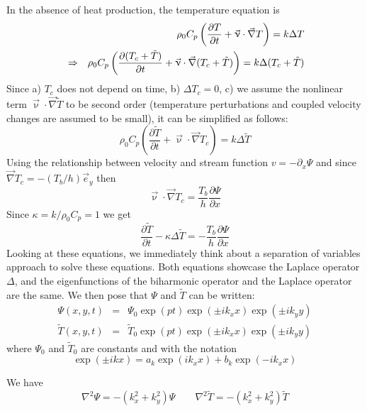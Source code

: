 In the absence of heat production, the temperature equation is 
\begin{eqnarray}
&& \rho_0 C_p \left( \frac{\partial T}{\partial t} + {\vec \upnu}\cdot {\vec \nabla} T \right) 
= k \Delta T \nonumber\\
&\Rightarrow&
\rho_0 C_p \left( \frac{\partial (T_c+\tilde{T})}{\partial t} + {\vec \upnu}\cdot {\vec \nabla} 
(T_c+\tilde{T}) \right) 
= k \Delta (T_c+\tilde{T})
\end{eqnarray}
Since a) $T_c$ does not depend on time, b) $\Delta T_c=0$, c) we assume the nonlinear 
term ${\vec \upnu}\cdot {\vec \nabla} \tilde{T} $ to be second order (temperature perturbations and 
coupled velocity changes are assumed to be small), it can be simplified as follows:
\[
\rho_0 C_p \left( \frac{\partial \tilde{T}}{\partial t} + {\vec \upnu}\cdot {\vec \nabla} T_c \right) 
= k \Delta \tilde{T}
\]
Using the relationship between velocity and stream function
$v=-\partial_x \Psi$
and since $\vec\nabla T_c = - (T_b/h) \vec{e}_y$ then
\[
{\vec \upnu}\cdot {\vec \nabla} T_c =  \frac{T_b}{h}   \frac{\partial \Psi}{\partial x} 
\]
Since $\kappa =k/\rho_0 C_p=1$ we get 
\begin{equation}
\boxed{
\frac{\partial \tilde{T}}{\partial t} - \kappa \Delta \tilde{T} 
= -  \frac{T_b}{h}   \frac{\partial \Psi}{\partial x}
}
\end{equation}
Looking at these equations, we immediately think about a separation of variables approach to solve these
equations. Both equations showcase the Laplace operator $\Delta$, and the eigenfunctions of the biharmonic operator and the Laplace operator are the same. 
We then pose that $\Psi$ and $\tilde{T}$ can be written:
\begin{eqnarray}
\Psi(x,y,t) &=& \Psi_0 \exp(pt)\exp(\pm i k_x x) \exp(\pm i k_y y) \\ %
\tilde{T}(x,y,t) &=& \tilde{T}_0 \exp(pt) \exp(\pm i k_x x) \exp(\pm i k_y y) %
\end{eqnarray}
where $\Psi_0$ and $\tilde{T}_0$ are constants and with the notation
\[
\exp (\pm i k x) = a_k \exp (i k_x x) + b_k \exp (-i k_x x )
\]

\begin{remark} We have
\[
\nabla^2 \Psi = -(k_x^2+k_y^2) \Psi
\quad\quad
\nabla^2 \tilde{T} = -(k_x^2+k_y^2) \tilde{T}
\]
\end{remark}

